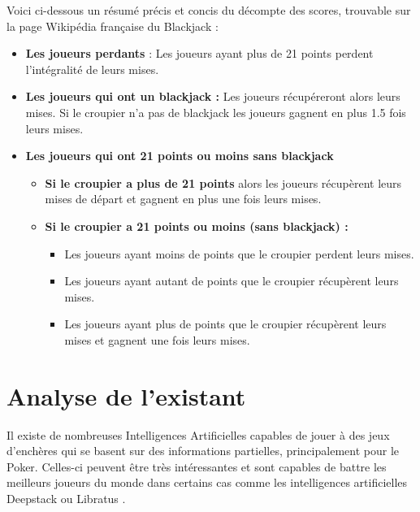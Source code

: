 \begin{itemize}
    Voici ci-dessous un résumé précis et concis du décompte des scores, trouvable sur la page Wikipédia française du Blackjack : 

    \begin{itemize}\itshape
        \item \textbf{Les joueurs perdants} : Les joueurs ayant plus de 21 points perdent l'intégralité de leurs mises.

        \item \textbf{Les joueurs qui ont un blackjack :}
        Les joueurs récupéreront alors leurs mises. Si le croupier n'a pas de blackjack les joueurs gagnent en plus 1.5 fois leurs mises.
        
        \item \textbf{Les joueurs qui ont 21 points ou moins sans blackjack} 
        \begin{itemize}\itshape
            \item \textbf{Si le croupier a plus de 21 points} alors les joueurs récupèrent leurs mises de départ et gagnent en plus une fois leurs mises.
            \item \textbf{Si le croupier a 21 points ou moins (sans blackjack) :}
                \begin{itemize}
                \item Les joueurs ayant moins de points que le croupier perdent leurs mises.
                \item Les joueurs ayant autant de points que le croupier récupèrent leurs mises.
                \item Les joueurs ayant plus de points que le croupier récupèrent leurs mises et gagnent une fois leurs mises.
                \end{itemize}
        \end{itemize}
    \end{itemize}
\end{itemize}
\bigskip

\section{Analyse de l'existant}
Il existe de nombreuses Intelligences Artificielles capables de jouer à des jeux d'enchères qui se basent sur des informations partielles, principalement pour le Poker. Celles-ci peuvent être très intéressantes et sont capables de battre les meilleurs joueurs du monde dans certains cas comme les intelligences artificielles Deepstack \cite{deepstack} ou Libratus \cite{libratusBlog}.

